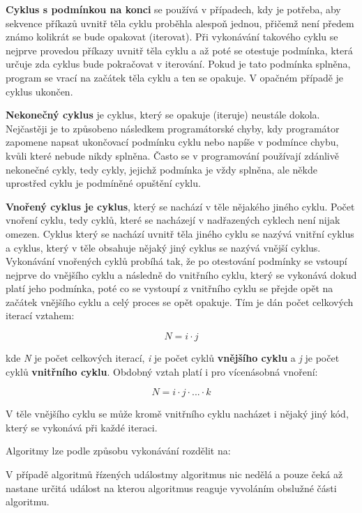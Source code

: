 {\bf Cyklus s podmínkou na konci} se používá v případech, kdy je potřeba, aby sekvence příkazů uvnitř těla cyklu proběhla alespoň jednou, přičemž není předem známo kolikrát se bude opakovat (iterovat). Při vykonávání takového cyklu se nejprve provedou příkazy uvnitř těla cyklu a až poté se otestuje podmínka, která určuje zda cyklus bude pokračovat v iterování. Pokud je tato podmínka splněna, program se vrací na začátek těla cyklu a ten se opakuje. V opačném případě je cyklus ukončen.

{\bf Nekonečný cyklus} je cyklus, který se opakuje (iteruje) neustále dokola. Nejčastěji je to způsobeno následkem programátorské chyby, kdy programátor zapomene napsat ukončovací podmínku cyklu nebo napíše v podmínce chybu, kvůli které nebude nikdy splněna. Často se v programování používají zdánlivě nekonečné cykly, tedy cykly, jejichž podmínka je vždy splněna, ale někde uprostřed cyklu je podmíněné opuštění cyklu.

{\bf Vnořený cyklus je cyklus}, který se nachází v těle nějakého jiného cyklu. Počet vnoření cyklu, tedy cyklů, které se nacházejí v nadřazených cyklech není nijak omezen. Cyklus který se nachází uvnitř těla jiného cyklu se nazývá vnitřní cyklus a cyklus, který v těle obsahuje nějaký jiný cyklus se nazývá vnější cyklus. Vykonávání vnořených cyklů probíhá tak, že po otestování podmínky se vstoupí nejprve do vnějšího cyklu a následně do vnitřního cyklu, který se vykonává dokud platí jeho podmínka, poté co se vystoupí z vnitřního cyklu se přejde opět na začátek vnějšího cyklu a celý proces se opět opakuje. Tím je dán počet celkových iterací vztahem:

$$ N = i \cdot j $$

kde {\it N} je počet celkových iterací, {\it i} je počet cyklů {\bf vnějšího cyklu} a {\it j} je počet cyklů {\bf vnitřního cyklu}. Obdobný vztah platí i pro vícenásobná vnoření:

$$ N = i \cdot j \cdot ... \cdot k $$

V těle vnějšího cyklu se může kromě vnitřního cyklu nacházet i nějaký jiný kód, který se vykonává při každé iteraci.

Algoritmy lze podle způsobu vykonávání rozdělit na:

\vskip 4mm
\vskip 4mm


V případě algoritmů řízených událostmy algoritmus nic nedělá a pouze čeká až nastane určitá událost na kterou algoritmus reaguje vyvoláním obslužné části algoritmu.

